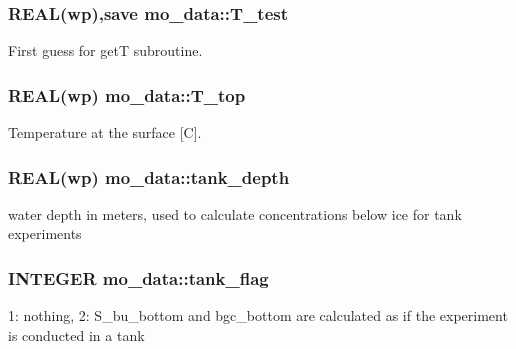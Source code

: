 \hypertarget{namespacemo__data_a7b3b4a04c1efd94e6c3f21e9bfd5fdad}{
\subsubsection[{T\_\-test}]{\setlength{\rightskip}{0pt plus 5cm}REAL(wp),save {\bf mo\_\-data::T\_\-test}}}
\label{namespacemo__data_a7b3b4a04c1efd94e6c3f21e9bfd5fdad}


First guess for getT subroutine. 

\hypertarget{namespacemo__data_abefbe1cf82237d7380ba0d7de788a07a}{
\subsubsection[{T\_\-top}]{\setlength{\rightskip}{0pt plus 5cm}REAL(wp) {\bf mo\_\-data::T\_\-top}}}
\label{namespacemo__data_abefbe1cf82237d7380ba0d7de788a07a}


Temperature at the surface \mbox{[}C\mbox{]}. 

\hypertarget{namespacemo__data_aa2b42f87a9dc571898326286dfab4350}{
\subsubsection[{tank\_\-depth}]{\setlength{\rightskip}{0pt plus 5cm}REAL(wp) {\bf mo\_\-data::tank\_\-depth}}}
\label{namespacemo__data_aa2b42f87a9dc571898326286dfab4350}


water depth in meters, used to calculate concentrations below ice for tank experiments 

\hypertarget{namespacemo__data_a20840603c089c697b8662ca2c45f23f3}{
\subsubsection[{tank\_\-flag}]{\setlength{\rightskip}{0pt plus 5cm}INTEGER {\bf mo\_\-data::tank\_\-flag}}}
\label{namespacemo__data_a20840603c089c697b8662ca2c45f23f3}


1: nothing, 2: S\_\-bu\_\-bottom and bgc\_\-bottom are calculated as if the experiment is conducted in a tank 

